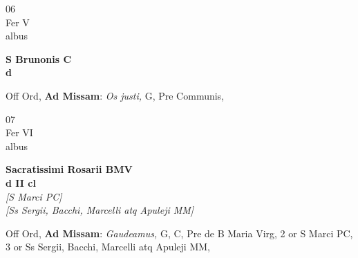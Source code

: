 \documentclass[10pt, openany]{book}
\begin{document}
        \begin{center}
            \begin{minipage}{3.5in}
                \vspace{2em}
                \begin{minipage}{0.5in}
                    {\Huge 06} \\
                    {\normalsize Fer V} \\
                    {\normalsize albus}
                \end{minipage}
                \begin{minipage}{3.0in}
                    \textbf{ \large S Brunonis C \\
                    \textnormal{\normalsize d}} \\ 
                \end{minipage}
                \begin{justify}Off Ord, \textbf{Ad Missam}: \textit{Os justi,} G, Pre Communis,  
                \end{justify}
            \end{minipage}
        \end{center}
    
        \begin{center}
            \begin{minipage}{3.5in}
                \vspace{2em}
                \begin{minipage}{0.5in}
                    {\Huge 07} \\
                    {\normalsize Fer VI} \\
                    {\normalsize albus}
                \end{minipage}
                \begin{minipage}{3.0in}
                    \textbf{ \large Sacratissimi Rosarii BMV \\
                    \textnormal{\normalsize d II cl}} \\ \textit{[S Marci PC]} \\ \textit{[Ss Sergii, Bacchi, Marcelli atq Apuleji MM]} \\ 
                \end{minipage}
                \begin{justify}Off Ord, \textbf{Ad Missam}: \textit{Gaudeamus,} G, C, Pre de B Maria Virg, 2 or S Marci PC, 3 or Ss Sergii, Bacchi, Marcelli atq Apuleji MM,  
                \end{justify}
            \end{minipage}
        \end{center}
    
\end{document}

